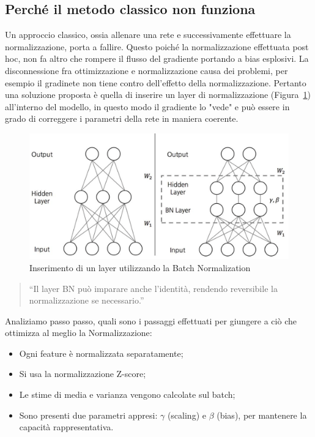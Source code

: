 \subsection{Perché il metodo classico non funziona}
Un approccio classico, ossia allenare una rete e successivamente effettuare la normalizzazione, porta a fallire. Questo poiché la normalizzazione effettuata post hoc, non fa altro che rompere il flusso del gradiente portando a bias esplosivi. La disconnessione fra ottimizzazione e normalizzazione causa dei problemi, per esempio il gradinete non tiene contro dell'effetto della normalizzazione. Pertanto una soluzione proposta è quella di inserire un layer di normalizzazione (Figura~\ref{fig:bn-layer}) all'interno del modello, in questo modo il gradiente lo "vede" e può essere in grado di correggere i parametri della rete in maniera coerente.
\begin{figure}
    \centering
    \includegraphics[width=0.85\linewidth]{figure/BNlayer.png}
    \caption{Inserimento di un layer utilizzando la Batch Normalization}
    \label{fig:bn-layer}
\end{figure}
\begin{quote}
“Il layer BN può imparare anche l’identità, rendendo reversibile la normalizzazione se necessario.”
\end{quote}

Analiziamo passo passo, quali sono i passaggi effettuati per giungere a ciò che ottimizza al meglio la Normalizzazione:
\begin{itemize}
  \item Ogni feature è normalizzata separatamente;
  \item Si usa la normalizzazione Z-score;
  \item Le stime di media e varianza vengono calcolate sul batch;
  \item Sono presenti due parametri appresi: $\gamma$ (scaling) e $\beta$ (bias), per mantenere la capacità rappresentativa.
\end{itemize}

